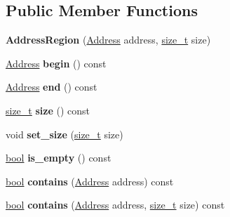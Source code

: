 \subsection*{Public Member Functions}
\begin{DoxyCompactItemize}
\item 
\mbox{\label{classv8_1_1base_1_1AddressRegion_a0e1dd2e78720b25911ea14e5df995f03}} 
{\bfseries Address\+Region} (\mbox{\hyperlink{classuintptr__t}{Address}} address, \mbox{\hyperlink{classsize__t}{size\+\_\+t}} size)
\item 
\mbox{\label{classv8_1_1base_1_1AddressRegion_a94a15b5dca8bef88c66880c9b00281ea}} 
\mbox{\hyperlink{classuintptr__t}{Address}} {\bfseries begin} () const
\item 
\mbox{\label{classv8_1_1base_1_1AddressRegion_a13bbde71869b71658a03746941a13f69}} 
\mbox{\hyperlink{classuintptr__t}{Address}} {\bfseries end} () const
\item 
\mbox{\label{classv8_1_1base_1_1AddressRegion_a753daf867d9e52511d3483b211a9f0b2}} 
\mbox{\hyperlink{classsize__t}{size\+\_\+t}} {\bfseries size} () const
\item 
\mbox{\label{classv8_1_1base_1_1AddressRegion_adc48f605d82ef43f598ce6bafcf7d4e7}} 
void {\bfseries set\+\_\+size} (\mbox{\hyperlink{classsize__t}{size\+\_\+t}} size)
\item 
\mbox{\label{classv8_1_1base_1_1AddressRegion_a29afd92431f4eb737887d7c7ff9b9396}} 
\mbox{\hyperlink{classbool}{bool}} {\bfseries is\+\_\+empty} () const
\item 
\mbox{\label{classv8_1_1base_1_1AddressRegion_ad799a0c1d53c9117b94f95e6bc742e66}} 
\mbox{\hyperlink{classbool}{bool}} {\bfseries contains} (\mbox{\hyperlink{classuintptr__t}{Address}} address) const
\item 
\mbox{\label{classv8_1_1base_1_1AddressRegion_ac96c37330af72155870c6dabb1ddef80}} 
\mbox{\hyperlink{classbool}{bool}} {\bfseries contains} (\mbox{\hyperlink{classuintptr__t}{Address}} address, \mbox{\hyperlink{classsize__t}{size\+\_\+t}} size) const

\end{DoxyCompactItemize}
